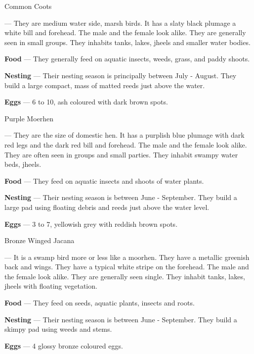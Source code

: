 \begin{bird}{Common Coots}

 --- They are medium water side, marsh birds. It has a slaty black plumage a white bill and forehead. The male and the female look alike. They are generally seen in small groups. They inhabits tanks, lakes, jheels and smaller water bodies. 

{\large\bf Food} --- They generally feed on aquatic insects, weeds, grass, and paddy shoots. 

{\large\bf Nesting} --- Their nesting season is principally between July - August. They build a large compact, mass of matted reeds just above the water.

{\bf Eggs} --- 6 to 10, ash coloured with dark brown spots.
\end{bird}

\begin{bird}{Purple Moerhen}

 --- They are the size of domestic hen. It has a purplish blue plumage with dark red legs and the dark red bill and forehead. The male and the female look alike. They are often seen in groups and small parties. They inhabit swampy water beds, jheels.

{\large\bf Food} --- They feed on aquatic insects and shoots of water plants. 

{\large\bf Nesting} --- Their nesting season is between June - September. They build a large pad using floating debris and reeds just above the water level. 

{\large\bf Eggs} --- 3 to 7, yellowish grey with reddish brown spots.
\end{bird}

\newpage

\begin{bird}{Bronze Winged Jacana}

 --- It is a swamp bird more or less like a moorhen. They have a metallic greenish back and wings. They have a typical white stripe on the forehead. The male and the female look alike. They are generally seen single. They inhabit tanks, lakes, jheels with floating vegetation. 

{\large\bf Food} --- They feed on seeds, aquatic plants, insects and roots.

{\large\bf Nesting} --- Their nesting season is between June - September. They build a skimpy pad using weeds and stems.

{\large\bf Eggs} --- 4 glossy bronze coloured eggs.
\end{bird}


